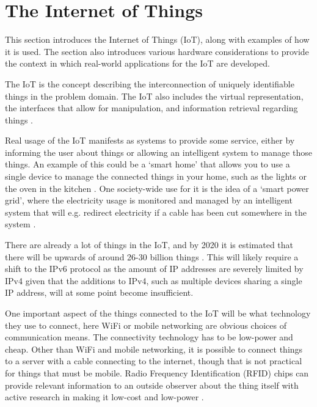 \section{The Internet of Things}
This section introduces the Internet of Things (IoT), along with examples of how it is used. 
The section also introduces various hardware considerations to provide the context in which real-world applications for the IoT are developed.

The IoT is the concept describing the interconnection of uniquely identifiable things in the problem domain.
The IoT also includes the virtual representation, the interfaces that allow for manipulation, and information retrieval regarding things \citep{misc:InternetOfThingsDefinition, misc:InternetOfThingsDefinition2, misc:InternetOfThingsDefinition3}.

Real usage of the IoT manifests as systems to provide some service, either by informing the user about things or allowing an intelligent system to manage those things.
An example of this could be a `smart home' that allows you to use a single device to manage the connected things in your home, such as the lights or the oven in the kitchen \citep{misc:InternetOfThingsExamples}.
One society-wide use for it is the idea of a `smart power grid', where the electricity usage is monitored and managed by an intelligent system that will e.g. redirect electricity if a cable has been cut somewhere in the system \citep{misc:smartGrid}.

There are already a lot of things in the IoT, and by 2020 it is estimated that there will be upwards of around 26-30 billion things \citep{misc:IoTGrowth1,misc:IoTGrowth2}.
This will likely require a shift to the IPv6 protocol as the amount of IP addresses are severely limited by IPv4 \citep{misc:numberOfAddresses} given that the additions to IPv4, such as multiple devices sharing a single IP address, will at some point become insufficient.

One important aspect of the things connected to the IoT will be what technology they use to connect, here WiFi or mobile networking are obvious choices of communication means.
The connectivity technology has to be low-power and cheap.
Other than WiFi and mobile networking, it is possible to connect things to a server with a cable connecting to the internet, though that is not practical for things that must be mobile.
Radio Frequency Identification (RFID) chips can provide relevant information to an outside observer about the thing itself \citep{misc:rfid} with active research in making it low-cost and low-power \citep{misc:rfid2}.

